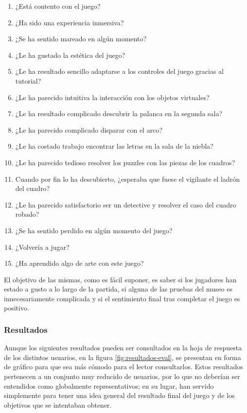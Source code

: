 \begin{enumerate}
    \item ¿Está contento con el juego?
    \item ¿Ha sido una experiencia inmersiva?
    \item ¿Se ha sentido mareado en algún momento?
    \item ¿Le ha gustado la estética del juego?
    \item ¿Le ha resultado sencillo adaptarse a los controles del juego gracias al tutorial?
    \item ¿Le ha parecido intuitiva la interacción con los objetos virtuales?
    \item ¿Le ha resultado complicado descubrir la palanca en la segunda sala?
    \item ¿Le ha parecido complicado disparar con el arco? 
    \item ¿Le ha costado trabajo encontrar las letras en la sala de la niebla?
    \item ¿Le ha parecido tedioso resolver los puzzles con las piezas de los cuadros?
    \item Cuando por fin lo ha descubierto, ¿esperaba que fuese el vigilante el ladrón del cuadro?
    \item ¿Le ha parecido satisfactorio ser un detective y resolver el caso del cuadro robado?
    \item ¿Se ha sentido perdido en algún momento del juego?
    \item ¿Volvería a jugar?
    \item ¿Ha aprendido algo de arte con este juego?
\end{enumerate}

El objetivo de las mismas, como es fácil suponer, es saber si los jugadores han estado a gusto a lo largo de la partida, si alguna de las pruebas del museo es innecesariamente complicada y si el sentimiento final tras completar el juego es positivo.

\subsubsection{Resultados}

Aunque los siguientes resultados pueden ser consultados en la hoja de respuesta de los distintos usuarios, en la figura \ref{fig:resultados-eval}, se presentan en forma de gráfico para que sea más cómodo para el lector consultarlos. Estos resultados pertenecen a un conjunto muy reducido de usuarios, por lo que no deberían ser entendidos como globalmente representativos; en su lugar, han servido simplemente para tener una idea general del resultado final del juego y de los objetivos que se intentaban obtener.


